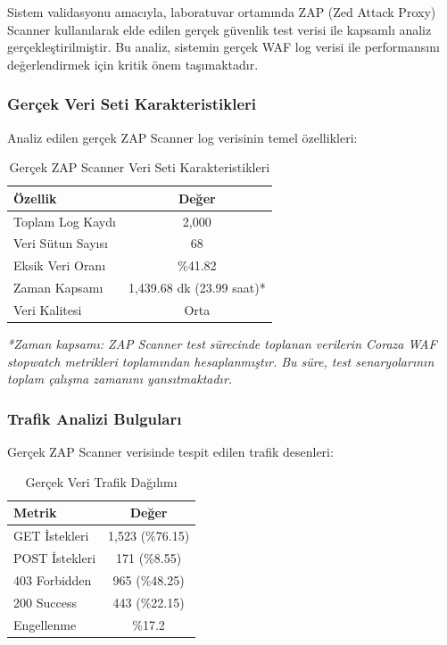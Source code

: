 Sistem validasyonu amacıyla, laboratuvar ortamında ZAP (Zed Attack Proxy) Scanner kullanılarak elde edilen gerçek güvenlik test verisi ile kapsamlı analiz gerçekleştirilmiştir. Bu analiz, sistemin gerçek WAF log verisi ile performansını değerlendirmek için kritik önem taşımaktadır.

\subsubsection{Gerçek Veri Seti Karakteristikleri}

Analiz edilen gerçek ZAP Scanner log verisinin temel özellikleri:

\begin{table}[!ht]
\centering
\caption{Gerçek ZAP Scanner Veri Seti Karakteristikleri}
\label{tab:real_data_characteristics}
\scriptsize
\begin{tabular}{|l|c|}
\hline
\textbf{Özellik} & \textbf{Değer} \\
\hline
Toplam Log Kaydı & 2,000 \\
\hline
Veri Sütun Sayısı & 68 \\
\hline
Eksik Veri Oranı & \%41.82 \\
\hline
Zaman Kapsamı & 1,439.68 dk (23.99 saat)* \\
\hline
Veri Kalitesi & Orta \\
\hline
\end{tabular}
\end{table}

\textit{*Zaman kapsamı: ZAP Scanner test sürecinde toplanan verilerin Coraza WAF stopwatch metrikleri toplamından hesaplanmıştır. Bu süre, test senaryolarının toplam çalışma zamanını yansıtmaktadır.}

\subsubsection{Trafik Analizi Bulguları}

Gerçek ZAP Scanner verisinde tespit edilen trafik desenleri:

\begin{table}[!ht]
\centering
\caption{Gerçek Veri Trafik Dağılımı}
\label{tab:real_traffic_analysis}
\tiny
\begin{tabular}{|l|c|}
\hline
\textbf{Metrik} & \textbf{Değer} \\
\hline
GET İstekleri & 1,523 (\%76.15) \\
\hline
POST İstekleri & 171 (\%8.55) \\
\hline
403 Forbidden & 965 (\%48.25) \\
\hline
200 Success & 443 (\%22.15) \\
\hline
Engellenme & \%17.2 \\
\hline
\end{tabular}
\end{table}

